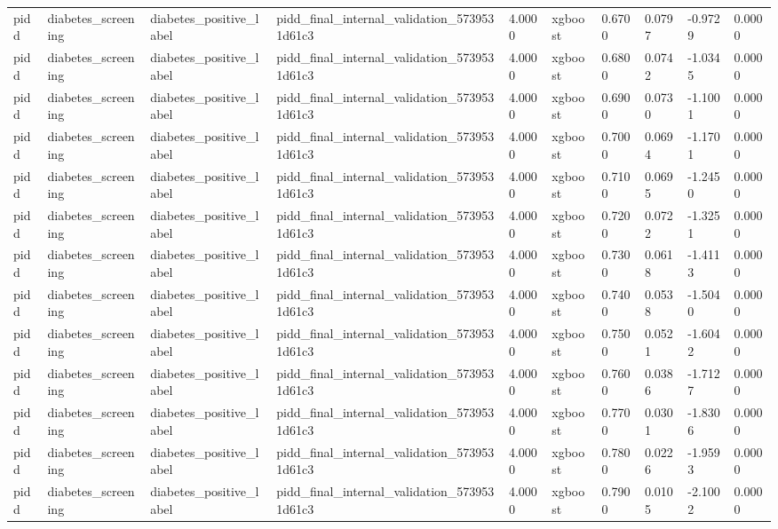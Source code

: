 \begin{tabular}{llllllllll}
pidd & diabetes\_screening & diabetes\_positive\_label & pidd\_final\_internal\_validation\_5739531d61c3 & 4.0000 & xgboost & 0.6700 & 0.0797 & -0.9729 & 0.0000 \\
pidd & diabetes\_screening & diabetes\_positive\_label & pidd\_final\_internal\_validation\_5739531d61c3 & 4.0000 & xgboost & 0.6800 & 0.0742 & -1.0345 & 0.0000 \\
pidd & diabetes\_screening & diabetes\_positive\_label & pidd\_final\_internal\_validation\_5739531d61c3 & 4.0000 & xgboost & 0.6900 & 0.0730 & -1.1001 & 0.0000 \\
pidd & diabetes\_screening & diabetes\_positive\_label & pidd\_final\_internal\_validation\_5739531d61c3 & 4.0000 & xgboost & 0.7000 & 0.0694 & -1.1701 & 0.0000 \\
pidd & diabetes\_screening & diabetes\_positive\_label & pidd\_final\_internal\_validation\_5739531d61c3 & 4.0000 & xgboost & 0.7100 & 0.0695 & -1.2450 & 0.0000 \\
pidd & diabetes\_screening & diabetes\_positive\_label & pidd\_final\_internal\_validation\_5739531d61c3 & 4.0000 & xgboost & 0.7200 & 0.0722 & -1.3251 & 0.0000 \\
pidd & diabetes\_screening & diabetes\_positive\_label & pidd\_final\_internal\_validation\_5739531d61c3 & 4.0000 & xgboost & 0.7300 & 0.0618 & -1.4113 & 0.0000 \\
pidd & diabetes\_screening & diabetes\_positive\_label & pidd\_final\_internal\_validation\_5739531d61c3 & 4.0000 & xgboost & 0.7400 & 0.0538 & -1.5040 & 0.0000 \\
pidd & diabetes\_screening & diabetes\_positive\_label & pidd\_final\_internal\_validation\_5739531d61c3 & 4.0000 & xgboost & 0.7500 & 0.0521 & -1.6042 & 0.0000 \\
pidd & diabetes\_screening & diabetes\_positive\_label & pidd\_final\_internal\_validation\_5739531d61c3 & 4.0000 & xgboost & 0.7600 & 0.0386 & -1.7127 & 0.0000 \\
pidd & diabetes\_screening & diabetes\_positive\_label & pidd\_final\_internal\_validation\_5739531d61c3 & 4.0000 & xgboost & 0.7700 & 0.0301 & -1.8306 & 0.0000 \\
pidd & diabetes\_screening & diabetes\_positive\_label & pidd\_final\_internal\_validation\_5739531d61c3 & 4.0000 & xgboost & 0.7800 & 0.0226 & -1.9593 & 0.0000 \\
pidd & diabetes\_screening & diabetes\_positive\_label & pidd\_final\_internal\_validation\_5739531d61c3 & 4.0000 & xgboost & 0.7900 & 0.0105 & -2.1002 & 0.0000 \\

\end{tabular}
